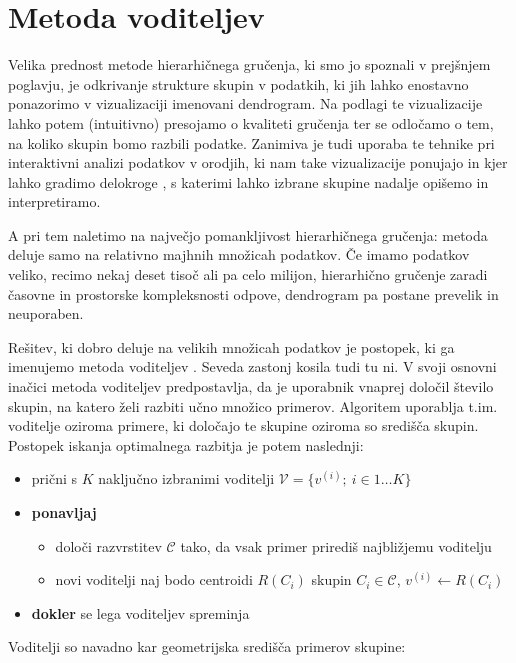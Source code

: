 \chapter{Metoda voditeljev}

Velika prednost metode hierarhičnega gručenja, ki smo jo spoznali v prejšnjem poglavju, je odkrivanje strukture skupin v podatkih, ki jih lahko enostavno ponazorimo v vizualizaciji imenovani dendrogram. Na podlagi te vizualizacije lahko potem (intuitivno) presojamo o kvaliteti gručenja ter se odločamo o tem, na koliko skupin bomo razbili podatke. Zanimiva je tudi uporaba te tehnike pri interaktivni analizi podatkov v orodjih, ki nam take vizualizacije ponujajo in kjer lahko gradimo delokroge , s katerimi lahko izbrane skupine nadalje opišemo in interpretiramo.

A pri tem naletimo na največjo pomankljivost hierarhičnega gručenja: metoda deluje samo na relativno majhnih množicah podatkov. Če imamo podatkov veliko, recimo nekaj deset tisoč ali pa celo milijon, hierarhično gručenje zaradi časovne in prostorske kompleksnosti odpove, dendrogram pa postane prevelik in neuporaben.

Rešitev, ki dobro deluje na velikih množicah podatkov je postopek, ki ga imenujemo metoda voditeljev . Seveda zastonj kosila tudi tu ni. V svoji
osnovni inačici metoda voditeljev predpostavlja, da je uporabnik vnaprej določil število skupin,
na katero želi razbiti učno množico primerov. Algoritem uporablja
t.im. voditelje oziroma primere, ki določajo te skupine oziroma so
središča skupin. Postopek iskanja optimalnega razbitja je potem
naslednji:

\begin{itemize}
\item prični s $K$ naključno izbranimi voditelji $\mathcal{V}=\{v^{(i)};\ i\in{1\ldots K}\}$
\item {\bf ponavljaj}
\begin{itemize}
  \item določi razvrstitev $\mathcal{C}$ tako, da vsak primer prirediš
    najbližjemu voditelju
  \item novi voditelji naj bodo centroidi $R(C_i)$ skupin $C_i\in\mathcal{C}$, $v^{(i)}\leftarrow R(C_i)$
\end{itemize}
\item {\bf dokler} se lega voditeljev spreminja
\end{itemize}

Voditelji  so navadno kar geometrijska središča primerov skupine:

